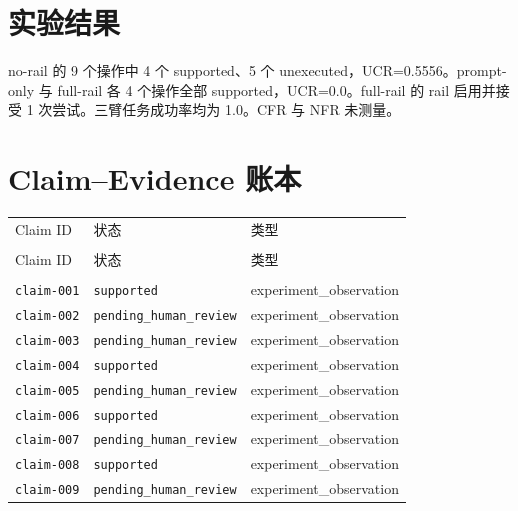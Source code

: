 \documentclass[UTF8]{ctexart}
\begin{document}
\section{实验结果}
no-\allowbreak{}rail 的 9 个操作中 4 个 supported、5 个 unexecuted，UCR=0.5556。prompt-\allowbreak{}only 与 full-\allowbreak{}rail 各 4 个操作全部 supported，UCR=0.0。full-\allowbreak{}rail 的 rail 启用并接受 1 次尝试。三臂任务成功率均为 1.0。CFR 与 NFR 未测量。
\section{Claim--Evidence 账本}
\begin{longtable}{@{}>{\raggedright\arraybackslash}p{}>{\raggedright\arraybackslash}p{}>{\raggedright\arraybackslash}p{}@{}}
\toprule
Claim ID & 状态 & 类型\\\\
\midrule
\endfirsthead
\toprule
Claim ID & 状态 & 类型\\\\
\midrule
\endhead
\texttt{\scriptsize claim-\allowbreak{}001} & \texttt{\scriptsize supported} & experiment\_\allowbreak{}observation \\
\texttt{\scriptsize claim-\allowbreak{}002} & \texttt{\scriptsize pending\_\allowbreak{}human\_\allowbreak{}review} & experiment\_\allowbreak{}observation \\
\texttt{\scriptsize claim-\allowbreak{}003} & \texttt{\scriptsize pending\_\allowbreak{}human\_\allowbreak{}review} & experiment\_\allowbreak{}observation \\
\texttt{\scriptsize claim-\allowbreak{}004} & \texttt{\scriptsize supported} & experiment\_\allowbreak{}observation \\
\texttt{\scriptsize claim-\allowbreak{}005} & \texttt{\scriptsize pending\_\allowbreak{}human\_\allowbreak{}review} & experiment\_\allowbreak{}observation \\
\texttt{\scriptsize claim-\allowbreak{}006} & \texttt{\scriptsize supported} & experiment\_\allowbreak{}observation \\
\texttt{\scriptsize claim-\allowbreak{}007} & \texttt{\scriptsize pending\_\allowbreak{}human\_\allowbreak{}review} & experiment\_\allowbreak{}observation \\
\texttt{\scriptsize claim-\allowbreak{}008} & \texttt{\scriptsize supported} & experiment\_\allowbreak{}observation \\
\texttt{\scriptsize claim-\allowbreak{}009} & \texttt{\scriptsize pending\_\allowbreak{}human\_\allowbreak{}review} & experiment\_\allowbreak{}observation \\

\end{longtable}
\end{document}
